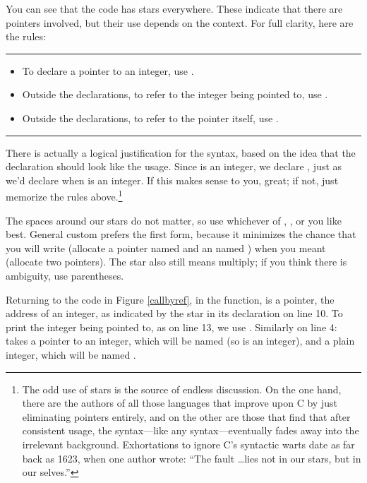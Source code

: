 \documentclass[12pt]{article}
\begin{document}
\lstset{numbers=left, numberstyle=\scshape}
\lstset{numbers=none}

You can see that the code has stars everywhere. These
indicate that there are pointers involved, but their use depends on the
context.
For full clarity, here are the rules:
\vspace \baselineskip
\hrule
\vspace \baselineskip
\begin{itemize}
\item To declare a pointer to an integer, use .
\item Outside the declarations, to refer to the integer being pointed to, use .
\item Outside the declarations, to refer to the pointer itself, use
.
\end{itemize}
\vspace \baselineskip
\hrule
\vspace \baselineskip

There is actually a
logical justification for the syntax, based on the
idea that the declaration should look like
the usage. Since  is an integer, we declare ,
just as we'd declare  when  is an integer.
If this makes sense to you, great; if not, just memorize the rules 
above.\footnote{The
odd use of stars is the source of endless discussion. On the one hand,
there are the authors of all those languages that improve upon C by
just eliminating pointers entirely, and on the other are those that find
that after consistent usage, the syntax---like any syntax---eventually
fades away into the irrelevant background.  Exhortations to ignore
C's syntactic warts date as far back as 1623, when one author wrote:
``The fault \dots lies not in our stars, but in our
selves.''}

The spaces around our stars do not matter, so use whichever of , , or  you like best. General
custom prefers the first form, because it minimizes the chance that you
will write  (allocate a pointer named 
and an  named ) when you meant  (allocate two pointers). The star also
still means multiply; if you think there is ambiguity, use parentheses.

Returning to the code in Figure \ref{callbyref}, in the 
function,  is a pointer, the address of an integer, as
indicated by the star in its declaration on line 10. To print the integer
being pointed to, as on line 13, we use .
Similarly on line 4:  takes a pointer to an integer,
which will be named  (so  is an integer),
and a plain integer, which will be named
.
\end{document}
